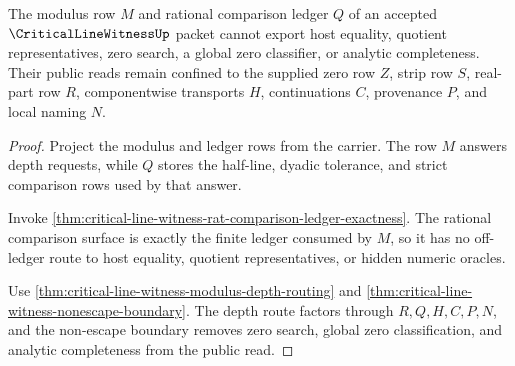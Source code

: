 \begin{theorem}
\label{thm:critical-line-witness-modulus-ledger-nonescape}
The modulus row $M$ and rational comparison ledger $Q$ of an accepted $\CriticalLineWitnessUp$ packet cannot export host equality, quotient representatives, zero search, a global zero classifier, or analytic completeness. Their public reads remain confined to the supplied zero row $Z$, strip row $S$, real-part row $R$, componentwise transports $H$, continuations $C$, provenance $P$, and local naming $N$.
\end{theorem}
\begin{proof}
Project the modulus and ledger rows from the carrier. The row $M$ answers depth requests, while $Q$ stores the half-line, dyadic tolerance, and strict comparison rows used by that answer.

Invoke \autoref{thm:critical-line-witness-rat-comparison-ledger-exactness}. The rational comparison surface is exactly the finite ledger consumed by $M$, so it has no off-ledger route to host equality, quotient representatives, or hidden numeric oracles.

Use \autoref{thm:critical-line-witness-modulus-depth-routing} and \autoref{thm:critical-line-witness-nonescape-boundary}. The depth route factors through $R,Q,H,C,P,N$, and the non-escape boundary removes zero search, global zero classification, and analytic completeness from the public read.
\end{proof}

